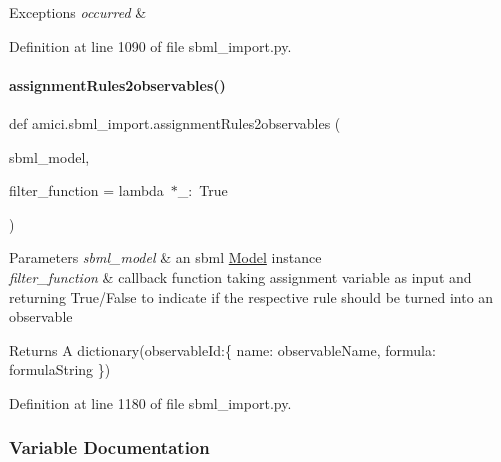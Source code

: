 \begin{DoxyExceptions}{Exceptions}
{\em occurred} & \\
\hline
\end{DoxyExceptions}


Definition at line 1090 of file sbml\+\_\+import.\+py.

\mbox{\label{namespaceamici_1_1sbml__import_aaba72ac8b7d363e7720f36495ccc3285}} 
\paragraph{\texorpdfstring{assignmentRules2observables()}{assignmentRules2observables()}}
{\footnotesize\ttfamily def amici.\+sbml\+\_\+import.\+assignment\+Rules2observables (\begin{DoxyParamCaption}\item[{}]{sbml\+\_\+model,  }\item[{}]{filter\+\_\+function = {\ttfamily lambda~$\ast$\+\_\+\+:~True} }\end{DoxyParamCaption})}


\begin{DoxyParams}{Parameters}
{\em sbml\+\_\+model} & an sbml \mbox{\hyperlink{classamici_1_1_model}{Model}} instance \\
\hline
{\em filter\+\_\+function} & callback function taking assignment variable as input and returning True/\+False to indicate if the respective rule should be turned into an observable \\
\hline
\end{DoxyParams}
\begin{DoxyReturn}{Returns}
A dictionary(observable\+Id\+:\{ \textquotesingle{}name\textquotesingle{}\+: observable\+Name, \textquotesingle{}formula\textquotesingle{}\+: formula\+String \}) 
\end{DoxyReturn}


Definition at line 1180 of file sbml\+\_\+import.\+py.



\subsubsection{Variable Documentation}
\mbox{\label{namespaceamici_1_1sbml__import_abfb00dffe8d5c524c2916febc9b3810b}} 
